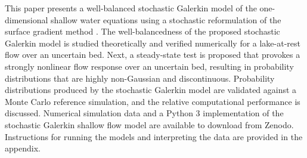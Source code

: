 This paper presents a well-balanced stochastic Galerkin model of the one-dimensional shallow water equations using a stochastic reformulation of the surface gradient method \citep{zhou2001}.
The well-balancedness of the proposed stochastic Galerkin model is studied theoretically and verified numerically for a lake-at-rest flow over an uncertain bed.
Next, a steady-state test is proposed that provokes a strongly nonlinear flow response over an uncertain bed, resulting in probability distributions that are highly non-Gaussian and discontinuous.
Probability distributions produced by the stochastic Galerkin model are validated against a Monte Carlo reference simulation, and the relative computational performance is discussed.
Numerical simulation data \citep{shaw-kesserwani2018a} and a Python 3 implementation of the stochastic Galerkin shallow flow model \citep{shaw-kesserwani2018b} are available to download from Zenodo.
Instructions for running the models and interpreting the data are provided in the appendix.

